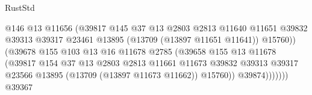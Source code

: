 \begin{lexlean}{RustStd}
\begin{coremodule}
                                                @146
                                                @13
                                                @11656
                                                (@39817
                                                  @145
                                                  @37
                                                  @13
                                                  @2803
                                                  @2813
                                                  @11640
                                                  @11651
                                                  @39832
                                                  @39313
                                                  @39317
                                                  @23461
                                                  @13895
                                                  (@13709 (@13897 @11651 @11641))
                                                  @15760))
                                              (@39678
                                                @155
                                                @103
                                                @13
                                                @16
                                                @11678
                                                @2785
                                                (@39658
                                                  @155
                                                  @13
                                                  @11678
                                                  (@39817
                                                    @154
                                                    @37
                                                    @13
                                                    @2803
                                                    @2813
                                                    @11661
                                                    @11673
                                                    @39832
                                                    @39313
                                                    @39317
                                                    @23566
                                                    @13895
                                                    (@13709 (@13897 @11673 @11662))
                                                    @15760))
                                                @39874)))))))
                                  @39367

\end{coremodule}
\end{lexlean}
